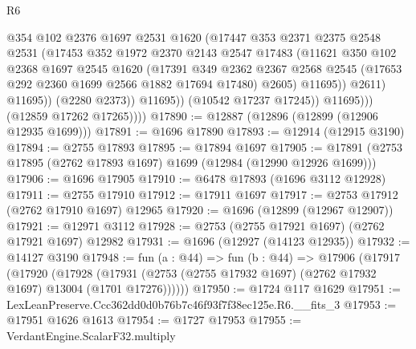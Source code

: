 \begin{lexlean}{R6}
\begin{coremodule}
                            @354
                            @102
                            @2376
                            @1697
                            @2531
                            @1620
                            (@17447
                              @353
                              @2371
                              @2375
                              @2548
                              @2531
                              (@17453
                                @352
                                @1972
                                @2370
                                @2143
                                @2547
                                @17483
                                (@11621
                                  @350
                                  @102
                                  @2368
                                  @1697
                                  @2545
                                  @1620
                                  (@17391
                                    @349
                                    @2362
                                    @2367
                                    @2568
                                    @2545
                                    (@17653 @292 @2360 @1699 @2566 @1882 @17694 @17480)
                                    @2605)
                                  @11695))
                              @2611)
                            @11695))
                        (@2280 @2373))
                      @11695))
                  (@10542 @17237 @17245))
                @11695)))
          (@12859 @17262 @17265))))
@17890 := @12887 (@12896 (@12899 (@12906 @12935 @1699)))
@17891 := @1696 @17890
@17893 := @12914 (@12915 @3190)
@17894 := @2755 @17893
@17895 := @17894 @1697
@17905 := @17891 (@2753 @17895 (@2762 @17893 @1697) @1699 (@12984 (@12990 @12926 @1699)))
@17906 := @1696 @17905
@17910 := @6478 @17893 (@1696 @3112 @12928)
@17911 := @2755 @17910
@17912 := @17911 @1697
@17917 := @2753 @17912 (@2762 @17910 @1697) @12965
@17920 := @1696 (@12899 (@12967 @12907))
@17921 := @12971 @3112
@17928 := @2753 (@2755 @17921 @1697) (@2762 @17921 @1697) @12982
@17931 := @1696 (@12927 (@14123 @12935))
@17932 := @14127 @3190
@17948 := fun (a : @44) =>
  fun (b : @44) =>
  @17906
    (@17917
      (@17920
        (@17928 (@17931 (@2753 (@2755 @17932 @1697) (@2762 @17932 @1697) @13004 (@1701 @17276))))))
@17950 := @1724 @117 @1629
@17951 := LexLeanPreserve.Ccc362dd0d0b76b7c46f93f7f38ec125e.R6.__fits_3
@17953 := @17951 @1626 @1613
@17954 := @1727 @17953
@17955 := VerdantEngine.ScalarF32.multiply

\end{coremodule}
\end{lexlean}
